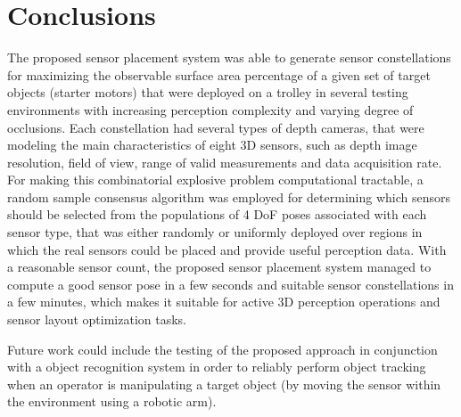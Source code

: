\section{Conclusions}\label{sec:conclusions}

The proposed sensor placement system was able to generate sensor constellations for maximizing the observable surface area percentage of a given set of target objects (starter motors) that were deployed on a trolley in several testing environments with increasing perception complexity and varying degree of occlusions. Each constellation had several types of depth cameras, that were modeling the main characteristics of eight 3D sensors, such as depth image resolution, field of view, range of valid measurements and data acquisition rate. For making this combinatorial explosive problem computational tractable, a random sample consensus algorithm was employed for determining which sensors should be selected from the populations of 4 DoF poses associated with each sensor type, that was either randomly or uniformly deployed over regions in which the real sensors could be placed and provide useful perception data. With a reasonable sensor count, the proposed sensor placement system managed to compute a good sensor pose in a few seconds and suitable sensor constellations in a few minutes, which makes it suitable for active 3D perception operations and sensor layout optimization tasks.

Future work could include the testing of the proposed approach in conjunction with a object recognition system in order to reliably perform object tracking when an operator is manipulating a target object (by moving the sensor within the environment using a robotic arm).%
